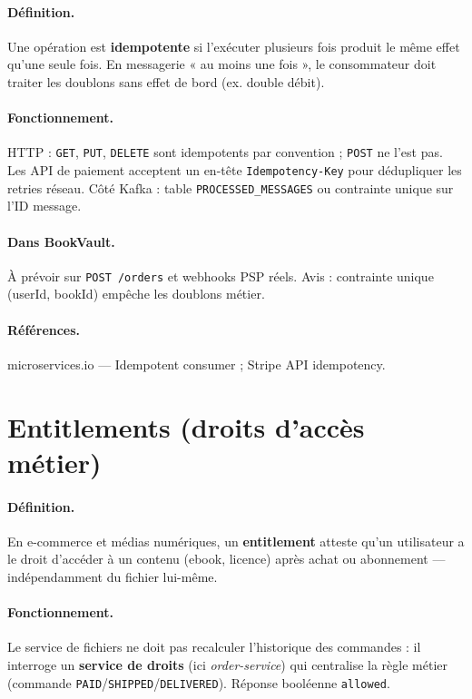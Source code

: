 \documentclass[12pt,a4paper]{report}
\begin{document}
\paragraph{Définition.} Une opération est \textbf{idempotente} si l'exécuter plusieurs fois produit le même effet qu'une seule fois. En messagerie « au moins une fois », le consommateur doit traiter les doublons sans effet de bord (ex. double débit).\par

\paragraph{Fonctionnement.} HTTP : \texttt{GET}, \texttt{PUT}, \texttt{DELETE} sont idempotents par convention ; \texttt{POST} ne l'est pas. Les API de paiement acceptent un en-tête \texttt{Idempotency-Key} pour dédupliquer les retries réseau. Côté Kafka : table \texttt{PROCESSED\_MESSAGES} ou contrainte unique sur l'ID message.\par

\paragraph{Dans BookVault.} À prévoir sur \texttt{POST /orders} et webhooks PSP réels. Avis : contrainte unique (userId, bookId) empêche les doublons métier.\par

\paragraph{Références.} microservices.io — Idempotent consumer ; Stripe API idempotency.\par


\section{Entitlements (droits d'accès métier)}

\paragraph{Définition.} En e-commerce et médias numériques, un \textbf{entitlement} atteste qu'un utilisateur a le droit d'accéder à un contenu (ebook, licence) après achat ou abonnement — indépendamment du fichier lui-même.\par

\paragraph{Fonctionnement.} Le service de fichiers ne doit pas recalculer l'historique des commandes : il interroge un \textbf{service de droits} (ici \textit{order-service}) qui centralise la règle métier (commande \texttt{PAID}/\texttt{SHIPPED}/\texttt{DELIVERED}). Réponse booléenne \texttt{allowed}.\par
\end{document}
